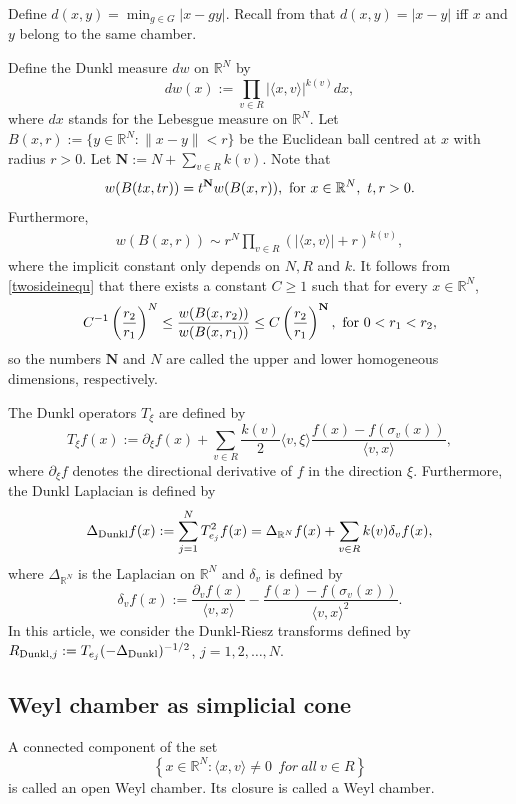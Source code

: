 \documentclass{amsart}
\begin{document}
Define $d(x,y)=\min_{g\in G}|x-gy|.$ Recall from \cite[Chapter VII, proof of Theorem 2.12]{MR514561} that $d(x,y)=|x-y|$ iff $x$ and $y$ belong to the same chamber.

Define the Dunkl measure $dw$ on $\mathbb{R}^N$ by
$$
dw(x) :=\prod_{v \in R} |\langle x,v\rangle|^{k(v)} dx,
$$
where $dx$ stands for the Lebesgue measure on $\mathbb{R}^N$. Let $B(x,r):=\{y\in \mathbb{R}^N:\|x-y\|< r\}$ be the Euclidean ball centred at $x$ with radius $r>0$. Let $\mathbf{N}:=N+\sum_{v\in R}k(v)$. Note that
$$w(B(tx,tr))=t^{\mathbf{N}}w(B(x,r)),\ {\rm for}\ x\in\mathbb{R}^N,\ t,r>0.$$
Furthermore,
\begin{align}\label{twosideinequ}
  w(B(x,r))\sim r^N \prod_{v \in R}(|\langle x, v \rangle |+r)^{k(v)},
\end{align}
where the implicit constant only depends on $N,R$ and $k$.  It follows from \eqref{twosideinequ} that there exists a constant $C\geq 1$ such that for every $x\in \mathbb{R}^N$,
\begin{align}\label{doublinginequality}
C^{-1}\left(\frac{r_2}{r_1}\right)^N\leq \frac{w(B(x,r_2))}{w(B(x,r_1))}\leq C\left(\frac{r_2}{r_1}\right)^{\mathbf{N}},\ {\rm for}\ 0<r_1<r_2,
\end{align}
so the numbers $\mathbf{N}$ and $N$ are called the upper and lower homogeneous dimensions, respectively.

The Dunkl operators $T_\xi$ are defined by
$$T_\xi f(x):=\partial_\xi f(x)+\sum_{v\in R}\frac{k(v)}{2}\langle v,\xi\rangle\frac{f(x)-f(\sigma_v(x))}{\langle v,x\rangle},$$
where $\partial_\xi f$ denotes the directional derivative of $f$ in the direction $\xi$. Furthermore, the Dunkl Laplacian is defined by
$$\Delta_{{\rm Dunkl}}f(x):=\sum_{j=1}^N T_{e_j}^2f(x)=\Delta_{\mathbb{R}^N}f(x)+\sum_{v\in R}k(v)\delta_v f(x),$$
where $\Delta_{\mathbb{R}^N}$ is the Laplacian on $\mathbb{R}^N$ and $\delta_v$ is defined by
$$\delta_v f(x):=\frac{\partial_v f(x)}{\langle v,x\rangle}-\frac{f(x)-f(\sigma_v(x))}{\langle v,x\rangle^2}.$$
In this article, we consider the Dunkl-Riesz transforms defined by $R_{{\rm Dunkl},j}:=T_{e_j}(-\Delta_{{\rm Dunkl}})^{-1/2}$, $j=1,2,\ldots,N$.

\subsection{Weyl chamber as simplicial cone}

\begin{definition} A connected component of the set
$$\left\{x\in\mathbb{R}^N:\langle x,v\rangle \neq 0\ \ { for} \ { all} \ v\in R\right\}$$
is called an open Weyl chamber. Its closure is called a Weyl chamber.
\end{definition}
\end{document}
